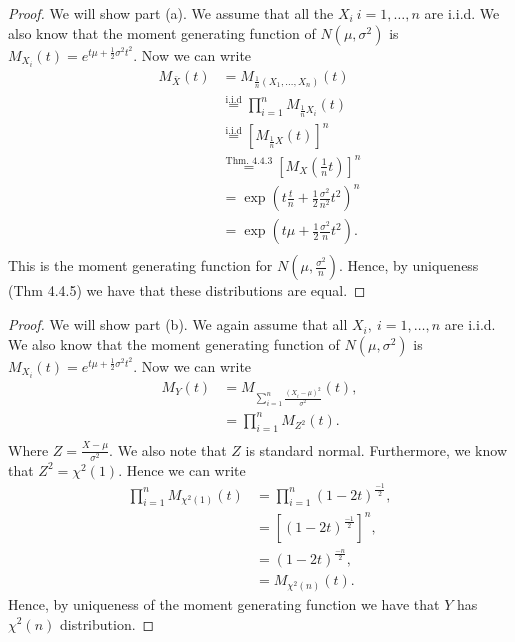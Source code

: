 \documentclass{article}
\newcommand{\randsamp}{X_1,\dots,X_n}
\newcommand{\mgf}{moment generating function }
\begin{document}
\begin{proof}
    We will show part (a). We assume that all the $X_i \ i = 1,\dots,n$ are i.i.d.
    We also know that the \mgf of $N(\mu, \sigma^2)$ is
    $M_{X_i}(t) = e^{t\mu + \frac{1}{2}\sigma^2t^2}$. Now we can write
    \begin{align*}
        M_{\bar{X}}(t) & = M_{\frac{1}{n}(\randsamp)}(t)                                        \\
                       & \stackrel{\text{i.i.d}}{=} \prod_{i=1}^n M_{\frac{1}{n}X_i}(t)         \\
                       & \stackrel{\text{i.i.d}}{=} [M_{\frac{1}{n}X}(t)]^n                     \\
                       & \stackrel{\text{Thm. 4.4.3}}{=} [M_X(\frac{1}{n}t)]^n                  \\
                       & = \exp\left(t\frac{t}{n} + \frac{1}{2}\frac{\sigma^2}{n^2}t^2\right)^n \\
                       & = \exp\left(t\mu + \frac{1}{2}\frac{\sigma^2}{n}t^2\right).            \\
    \end{align*}
    This is the \mgf for $N(\mu, \frac{\sigma^2}{n})$. Hence, by uniqueness (Thm 4.4.5) we
    have that these distributions are equal.
\end{proof}

\begin{proof}
    We will show part (b). We again assume that all $X_i, \ i = 1,\dots,n$ are i.i.d.
    We also know that the \mgf of $N(\mu, \sigma^2)$ is
    $M_{X_i}(t) = e^{t\mu + \frac{1}{2}\sigma^2t^2}$. Now we can write
    \begin{align*}
        M_Y(t) & = M_{\sum_{i=1}^n\frac{(X_i - \mu)^2}{\sigma^2}}(t), \\
               & = \prod_{i=1}^n M_{Z^2}(t).                          \\
    \end{align*}
    Where $Z = \frac{X - \mu}{\sigma^2}$. We also note that $Z$ is standard normal.
    Furthermore, we know that $Z^2 = \chi^2(1)$. Hence we can write
    \begin{align*}
        \prod_{i=1}^n M_{\chi^2(1)}(t) & =\prod_{i=1}^n (1-2t)^{\frac{-1}{2}},   \\
                                       & = \left[(1-2t)^{\frac{-1}{2}}\right]^n, \\
                                       & = (1-2t)^{\frac{-n}{2}},                \\
                                       & = M_{\chi^2(n)}(t).
    \end{align*}
    Hence, by uniqueness of the \mgf we have that $Y$ has $\chi^2(n)$ distribution.
\end{proof}
\end{document}
